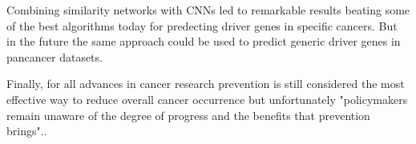 \documentclass{article}
\begin{document}
Combining similarity networks with CNNs led to remarkable results beating some of the best algorithms today for predecting driver genes in specific cancers. But in the future the same approach could be used to predict generic driver genes in pancancer datasets. 

Finally, for all advances in cancer research prevention is still considered the most effective way to reduce overall cancer occurrence but unfortunately "policymakers remain unaware of the degree of progress and the benefits that prevention brings".\cite{bray2018globalCancerStats}.




\end{document}
